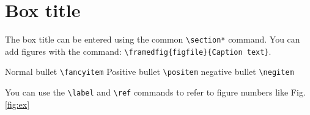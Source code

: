 \section*{Box title}
The box title can be entered using the common \verb|\section*|
command.
You can add figures with the command:
\verb|\framedfig{figfile}{Caption text}|.
\begin{center}
\begin{minipage}{0.48\textwidth}
\end{minipage}
\begin{minipage}{0.48\textwidth}
\label{fig:ex}
\end{minipage}
\end{center}
\vspace{-1.2cm}
\begin{itemize}
\fancyitem Normal bullet \verb|\fancyitem| 
\positem Positive bullet \verb|\positem| 
\negitem negative bullet \verb|\negitem| 
\end{itemize}
You can use the \verb|\label| and \verb|\ref| commands to refer to figure
numbers like Fig. \ref{fig:ex}



